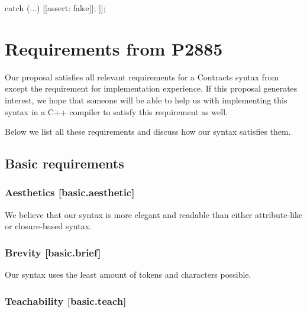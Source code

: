 \begin{minipage}{8cm}
\begin{codeblock}
    catch (...) {
      [[assert: false]];
    }
  ]];
\end{codeblock}
\end{minipage}
\begin{minipage}{8cm}
\begin{codeblock}
  catch (...) {
    assertexpr(false);
  }
};
\end{codeblock}
\end{minipage}



\section{Requirements from P2885}
\label{sec:requirements}

Our proposal satisfies all relevant requirements for a Contracts syntax from \cite{P2885R3} except the requirement for implementation experience. If this proposal generates interest, we hope that someone will be able to help us with implementing this syntax in a C++ compiler to satisfy this requirement as well.

Below we list all these requirements and discuss how our syntax satisfies them.

\subsection{Basic requirements}

\subsubsection{Aesthetics  [basic.aesthetic]}

We believe that our syntax is more elegant and readable than either attribute-like or closure-based syntax.

\subsubsection{Brevity  [basic.brief]}

Our syntax uses the least amount of tokens and characters possible.

\subsubsection{Teachability  [basic.teach]}

